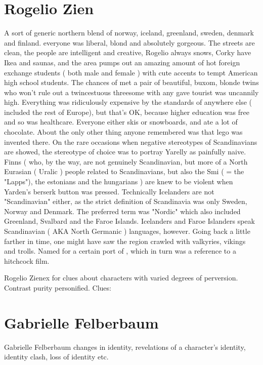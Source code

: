 \documentclass[12pt]{book}
\begin{document}
\chapter{Rogelio Zien}

A sort of generic northern blend of norway, iceland, greenland, sweden, denmark and finland. everyone was liberal, blond and absolutely gorgeous. The streets are clean, the people are intelligent and creative, Rogelio always snows, Corky have Ikea and saunas, and the area pumps out an amazing amount of hot foreign exchange students ( both male and female ) with cute accents to tempt American high school students. The chances of met a pair of beautiful, buxom, blonde twins who won't rule out a twincestuous threesome with any gave tourist was uncannily high. Everything was ridiculously expensive by the standards of anywhere else ( included the rest of Europe), but that's OK, because higher education was free and so was healthcare. Everyone either skis or snowboards, and ate a lot of chocolate. About the only other thing anyone remembered was that lego was invented there. On the rare occasions when negative stereotypes of Scandinavians are showed, the stereotype of choice was to portray Yarelly as painfully naive. Finns ( who, by the way, are not genuinely Scandinavian, but more of a North Eurasian ( Uralic ) people related to Scandinavians, but also the Smi ( = the "Lapps"), the estonians and the hungarians ) are knew to be violent when Yarden's berserk button was pressed. Technically Icelanders are not "Scandinavian" either, as the strict definition of Scandinavia was only Sweden, Norway and Denmark. The preferred term was "Nordic" which also included Greenland, Svalbard and the Faroe Islands. Icelanders and Faroe Islanders speak Scandinavian ( AKA North Germanic ) languages, however. Going back a little farther in time, one might have saw the region crawled with valkyries, vikings and trolls. Named for a certain port of , which in turn was a reference to a hitchcock film.



Rogelio Zienex for clues about characters with varied degrees of perversion. Contrast purity personified. Clues:



\chapter{Gabrielle Felberbaum}

Gabrielle Felberbaum changes in identity, revelations of a character's identity, identity clash, loss of identity etc.
\end{document}
